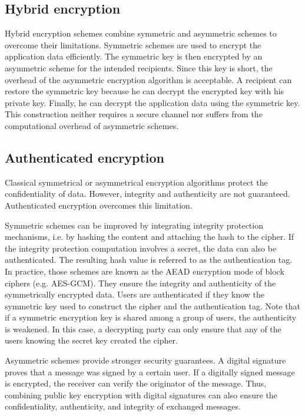 \documentclass[../main.tex]{subfiles}
\begin{document}
\subsection{Hybrid encryption}
\label{sec:hybrid}
Hybrid encryption schemes combine symmetric and asymmetric schemes to overcome their limitations.
Symmetric schemes are used to encrypt the application data efficiently.
The symmetric key is then encrypted by an asymmetric scheme for the intended recipients.
Since this key is short, the overhead of the asymmetric encryption algorithm is acceptable.
A recipient can restore the symmetric key because he can decrypt the encrypted key with his private key.
Finally, he can decrypt the application data using the symmetric key.
This construction neither requires a secure channel nor suffers from the computational overhead of asymmetric schemes.~\cite{Wolf2007}

\subsection{Authenticated encryption}
\label{sec:aead}
Classical symmetrical or asymmetrical encryption algorithms protect the confidentiality of data.
However, integrity and authenticity are not guaranteed.
Authenticated encryption overcomes this limitation.~\cite{Eckert2018, An2002}

Symmetric schemes can be improved by integrating integrity protection mechanisms, i.e. by hashing the content and attaching the hash to the cipher.
If the integrity protection computation involves a secret, the data can also be authenticated.
The resulting hash value is referred to as the authentication tag.
In practice, those schemes are known as the AEAD encryption mode of block ciphers (e.g. AES-GCM).
They ensure the integrity and authenticity of the symmetrically encrypted data.
Users are authenticated if they know the symmetric key used to construct the cipher and the authentication tag.
Note that if a symmetric encryption key is shared among a group of users, the authenticity is weakened.
In this case, a decrypting party can only ensure that any of the users knowing the secret key created the cipher.~\cite[315]{Eckert2018}

Asymmetric schemes provide stronger security guarantees.
A digital signature proves that a message was signed by a certain user.
If a digitally signed message is encrypted, the receiver can verify the originator of the message.
Thus, combining public key encryption with digital signatures can also ensure the confidentiality, authenticity, and integrity of exchanged messages.~\cite{An2002}
\end{document}
